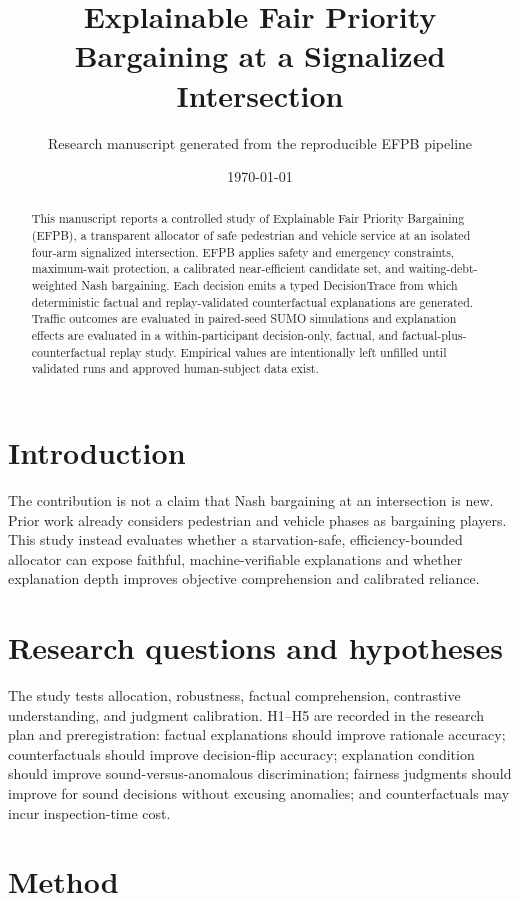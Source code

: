 \documentclass[11pt,a4paper]{article}
\title{Explainable Fair Priority Bargaining at a Signalized Intersection}
\author{Research manuscript generated from the reproducible EFPB pipeline}
\date{\today}
\begin{document}
\maketitle

\begin{abstract}
This manuscript reports a controlled study of Explainable Fair Priority Bargaining (EFPB), a transparent allocator of safe pedestrian and vehicle service at an isolated four-arm signalized intersection. EFPB applies safety and emergency constraints, maximum-wait protection, a calibrated near-efficient candidate set, and waiting-debt-weighted Nash bargaining. Each decision emits a typed DecisionTrace from which deterministic factual and replay-validated counterfactual explanations are generated. Traffic outcomes are evaluated in paired-seed SUMO simulations and explanation effects are evaluated in a within-participant decision-only, factual, and factual-plus-counterfactual replay study. Empirical values are intentionally left unfilled until validated runs and approved human-subject data exist.
\end{abstract}

\section{Introduction}
The contribution is not a claim that Nash bargaining at an intersection is new. Prior work already considers pedestrian and vehicle phases as bargaining players. This study instead evaluates whether a starvation-safe, efficiency-bounded allocator can expose faithful, machine-verifiable explanations and whether explanation depth improves objective comprehension and calibrated reliance.

\section{Research questions and hypotheses}
The study tests allocation, robustness, factual comprehension, contrastive understanding, and judgment calibration. H1--H5 are recorded in the research plan and preregistration: factual explanations should improve rationale accuracy; counterfactuals should improve decision-flip accuracy; explanation condition should improve sound-versus-anomalous discrimination; fairness judgments should improve for sound decisions without excusing anomalies; and counterfactuals may incur inspection-time cost.

\section{Method}
\end{document}
